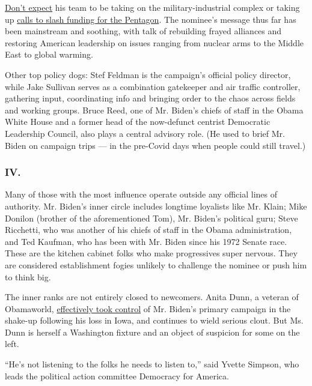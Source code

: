\href{https://www.theatlantic.com/ideas/archive/2020/05/bidens-grand-ambitions-dont-extend-foreign-policy/611863/}{Don't
expect} his team to be taking on the military-industrial complex or
taking up
\href{https://foreignpolicy.com/2020/05/11/biden-left-leaning-groups-slash-pentagon-budget/}{calls
to slash funding for the Pentagon}. The nominee's message thus far has
been mainstream and soothing, with talk of rebuilding frayed alliances
and restoring American leadership on issues ranging from nuclear arms to
the Middle East to global warming.

Other top policy dogs: Stef Feldman is the campaign's official policy
director, while Jake Sullivan serves as a combination gatekeeper and air
traffic controller, gathering input, coordinating info and bringing
order to the chaos across fields and working groups. Bruce Reed, one of
Mr. Biden's chiefs of staff in the Obama White House and a former head
of the now-defunct centrist Democratic Leadership Council, also plays a
central advisory role. (He used to brief Mr. Biden on campaign trips ---
in the pre-Covid days when people could still travel.)

\hypertarget{iv}{%
\subsubsection{IV.}\label{iv}}

Many of those with the most influence operate outside any official lines
of authority. Mr. Biden's inner circle includes longtime loyalists like
Mr. Klain; Mike Donilon (brother of the aforementioned Tom), Mr. Biden's
political guru; Steve Ricchetti, who was another of his chiefs of staff
in the Obama administration, and Ted Kaufman, who has been with Mr.
Biden since his 1972 Senate race. These are the kitchen cabinet folks
who make progressives super nervous. They are considered establishment
fogies unlikely to challenge the nominee or push him to think big.

The inner ranks are not entirely closed to newcomers. Anita Dunn, a
veteran of Obamaworld,
\href{https://www.nytimes3xbfgragh.onion/2020/02/07/us/politics/joe-biden-anita-dunn.html}{effectively
took control} of Mr. Biden's primary campaign in the shake-up following
his loss in Iowa, and continues to wield serious clout. But Ms. Dunn is
herself a Washington fixture and an object of suspicion for some on the
left.

``He's not listening to the folks he needs to listen to,'' said Yvette
Simpson, who leads the political action committee Democracy for America.

